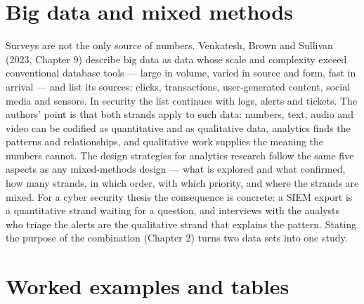 \documentclass[11pt,a4paper,british,twoside=false,headings=small,chapterprefix=false,numbers=noenddot]{scrbook}
\begin{document}
\section{Big data and mixed methods}

Surveys are not the only source of numbers. Venkatesh, Brown and Sullivan (2023, Chapter 9) describe big data as data whose scale and complexity exceed conventional database tools --- large in volume, varied in source and form, fast in arrival --- and list its sources: clicks, transactions, user-generated content, social media and sensors. In security the list continues with logs, alerts and tickets. The authors' point is that both strands apply to such data: numbers, text, audio and video can be codified as quantitative and as qualitative data, analytics finds the patterns and relationships, and qualitative work supplies the meaning the numbers cannot. The design strategies for analytics research follow the same five aspects as any mixed-methods design --- what is explored and what confirmed, how many strands, in which order, with which priority, and where the strands are mixed. For a cyber security thesis the consequence is concrete: a SIEM export is a quantitative strand waiting for a question, and interviews with the analysts who triage the alerts are the qualitative strand that explains the pattern. Stating the purpose of the combination (Chapter 2) turns two data sets into one study.


\section{Worked examples and tables}
\end{document}
